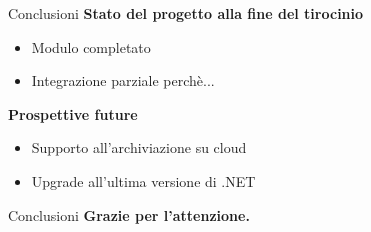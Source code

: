 \documentclass{beamer}
\begin{document}
\begin{darkframes}
  \begin{frame}{Conclusioni}
    \textbf{Stato del progetto alla fine del tirocinio}
    \begin{itemize}
      \item Modulo completato
      \item Integrazione parziale perchè...
    \end{itemize}
    \textbf{Prospettive future}
    \begin{itemize}
      \item Supporto all'archiviazione su cloud
      \item Upgrade all'ultima versione di .NET
    \end{itemize}
  \end{frame}

  \begin{frame}{Conclusioni}
    \textbf{Grazie per l'attenzione.}
  \end{frame}

\end{darkframes}
\end{document}
